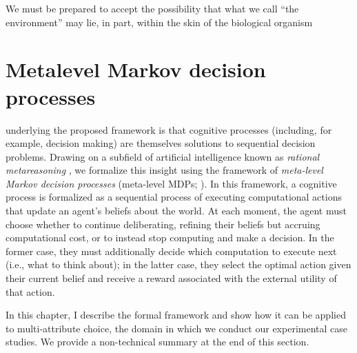 \begin{savequote}[75mm]
We must be prepared to accept the possibility that what we call ``the environment'' may lie, in part, within the skin of the biological organism
\end{savequote}

\chapter{Metalevel Markov decision processes}

 underlying the proposed framework is that cognitive processes (including, for example, decision making) are themselves solutions to sequential decision problems. Drawing on a subfield of artificial intelligence known as \emph{rational metareasoning} \citep{matheson1968economic,russell1991principles}, we formalize this insight using the framework of \emph{meta-level Markov decision processes} (meta-level MDPs; \citealp{hay2012selecting}). In this framework, a cognitive process is formalized as a sequential process of executing computational actions that update an agent's beliefs about the world. At each moment, the agent must choose whether to continue deliberating, refining their beliefs but accruing computational cost, or to instead stop computing and make a decision. In the former case, they must additionally decide which computation to execute next (i.e., what to think about); in the latter case, they select the optimal action given their current belief and receive a reward associated with the external utility of that action.

In this chapter, I describe the formal framework and show how it can be applied to multi-attribute choice, the domain in which we conduct our experimental case studies. We provide a non-technical summary at the end of this section.




